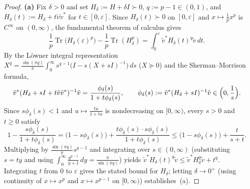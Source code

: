 \documentclass[10pt,letterpaper]{article}
\newcommand{\Tr}{\operatorname{Tr}}
\begin{document}
\begin{proof}
\textbf{(a)} Fix $\delta > 0$ and set $H_\delta := H + \delta I \succ 0$, $q := p - 1 \in (0,1)$, and $H_\delta(t) := H_\delta + t\tilde{v}\tilde{v}^*$ for $t \in [0,\varepsilon]$. Since $H_\delta(t) \succ 0$ on $[0,\varepsilon]$ and $x \mapsto \frac{1}{p}x^p$ is $C^\infty$ on $(0,\infty)$, the fundamental theorem of calculus gives
\[
  \frac{1}{p}\Tr\bigl(H_\delta(\varepsilon)^p\bigr) - \frac{1}{p}\Tr(H_\delta^p) = \int_0^\varepsilon \tilde{v}^* H_\delta(t)^q \tilde{v}\,dt.
\]
By the L\"owner integral representation $X^q = \frac{\sin(\pi q)}{\pi}\int_0^\infty s^{q-1}\bigl(I - s(X+sI)^{-1}\bigr)\,ds$ ($X \succeq 0$) and the Sherman--Morrison formula,
\[
  \tilde{v}^*(H_\delta + sI + t\tilde{v}\tilde{v}^*)^{-1}\tilde{v} = \frac{\phi_\delta(s)}{1 + t\phi_\delta(s)},
  \qquad \phi_\delta(s) := \tilde{v}^*(H_\delta + sI)^{-1}\tilde{v} \in \Bigl(0, \frac{1}{s}\Bigr).
\]
Since $s\phi_\delta(s) < 1$ and $u \mapsto \frac{tu}{1+tu}$ is nondecreasing on $[0,\infty)$, every $s > 0$ and $t \ge 0$ satisfy
\[
  1 - \frac{s\phi_\delta(s)}{1 + t\phi_\delta(s)}
  = \bigl(1 - s\phi_\delta(s)\bigr) + \frac{t\phi_\delta(s)\cdot s\phi_\delta(s)}{1 + t\phi_\delta(s)}
  \le \bigl(1 - s\phi_\delta(s)\bigr) + \frac{t}{s + t}.
\]
Multiplying by $\frac{\sin(\pi q)}{\pi} s^{q-1}$ and integrating over $s \in (0,\infty)$ (substituting $s = ty$ and using $\int_0^\infty \frac{y^{q-1}}{y+1}\,dy = \frac{\pi}{\sin(\pi q)}$) yields $\tilde{v}^* H_\delta(t)^q \tilde{v} \le \tilde{v}^* H_\delta^q \tilde{v} + t^q$. Integrating $t$ from $0$ to $\varepsilon$ gives the stated bound for $H_\delta$; letting $\delta \to 0^+$ (using continuity of $x \mapsto x^p$ and $x \mapsto x^{p-1}$ on $[0,\infty)$) establishes~(a).


\end{proof}
\end{document}
